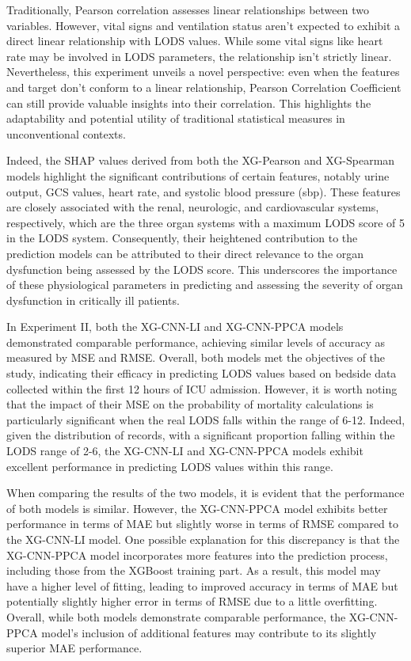 \documentclass[12pt,a4paper,english
]{tunithesis}
\begin{document}
Traditionally, Pearson correlation assesses linear relationships between two variables. However, vital signs and ventilation status aren't expected to exhibit a direct linear relationship with LODS values. While some vital signs like heart rate may be involved in LODS parameters, the relationship isn't strictly linear. Nevertheless, this experiment unveils a novel perspective: even when the features and target don't conform to a linear relationship, Pearson Correlation Coefficient can still provide valuable insights into their correlation. This highlights the adaptability and potential utility of traditional statistical measures in unconventional contexts.

Indeed, the SHAP values derived from both the XG-Pearson and XG-Spearman models highlight the significant contributions of certain features, notably urine output, GCS values, heart rate, and systolic blood pressure (sbp). These features are closely associated with the renal, neurologic, and cardiovascular systems, respectively, which are the three organ systems with a maximum LODS score of 5 in the LODS system. Consequently, their heightened contribution to the prediction models can be attributed to their direct relevance to the organ dysfunction being assessed by the LODS score. This underscores the importance of these physiological parameters in predicting and assessing the severity of organ dysfunction in critically ill patients. 

In Experiment II, both the XG-CNN-LI and XG-CNN-PPCA models demonstrated comparable performance, achieving similar levels of accuracy as measured by MSE and RMSE. Overall, both models met the objectives of the study, indicating their efficacy in predicting LODS values based on bedside data collected within the first 12 hours of ICU admission. However, it is worth noting that the impact of their MSE on the probability of mortality calculations is particularly significant when the real LODS falls within the range of 6-12. Indeed, given the distribution of records, with a significant proportion falling within the LODS range of 2-6, the XG-CNN-LI and XG-CNN-PPCA models exhibit excellent performance in predicting LODS values within this range.

When comparing the results of the two models, it is evident that the performance of both models is similar. However, the XG-CNN-PPCA model exhibits better performance in terms of MAE but slightly worse in terms of RMSE compared to the XG-CNN-LI model. One possible explanation for this discrepancy is that the XG-CNN-PPCA model incorporates more features into the prediction process, including those from the XGBoost training part. As a result, this model may have a higher level of fitting, leading to improved accuracy in terms of MAE but potentially slightly higher error in terms of RMSE due to a little overfitting. Overall, while both models demonstrate comparable performance, the XG-CNN-PPCA model's inclusion of additional features may contribute to its slightly superior MAE performance.
\end{document}
